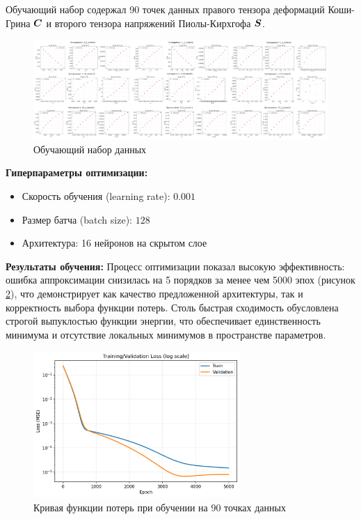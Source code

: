 Обучающий набор содержал 90 точек данных правого тензора деформаций Коши-Грина $\boldsymbol{C}$ 
и второго тензора напряжений Пиолы-Кирхгофа $\boldsymbol{S}$.

\begin{figure}[H]
  \centering
  \includegraphics[width=1.0\textwidth]{img/all_stress_plots.png}
  \caption{Обучающий набор данных}
  \label{fig:training_data}
\end{figure}

\textbf{Гиперпараметры оптимизации:}
\begin{itemize}
  \item Скорость обучения (learning rate): $0.001$
  \item Размер батча (batch size): $128$
  \item Архитектура: 16 нейронов на скрытом слое
\end{itemize}

\textbf{Результаты обучения:}
Процесс оптимизации показал высокую эффективность: ошибка аппроксимации снизилась на 5 порядков за менее чем 5000 эпох (рисунок \ref{fig:loss_curve}), 
что демонстрирует как качество предложенной архитектуры, так и корректность выбора функции потерь. 
Столь быстрая сходимость обусловлена строгой выпуклостью функции энергии, что обеспечивает единственность 
минимума и отсутствие локальных минимумов в пространстве параметров.

\begin{figure}[H]
  \centering
  \includegraphics[width=0.7\textwidth]{img/loss_curve.png}
  \caption{Кривая функции потерь при обучении на 90 точках данных}
  \label{fig:loss_curve}
\end{figure}


